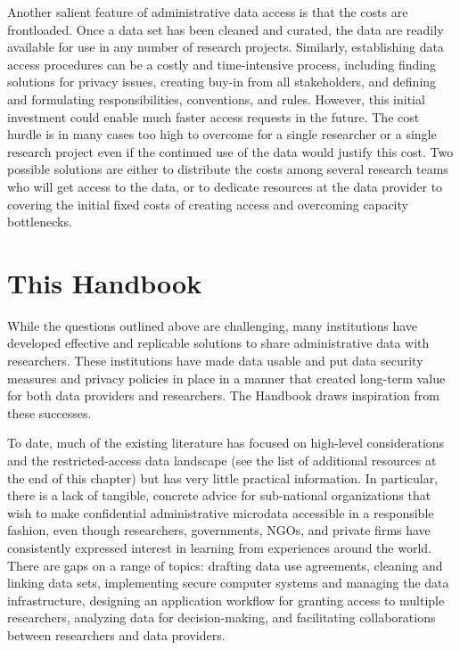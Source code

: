 Another salient feature of administrative data access is that the costs are frontloaded. Once a data set has been cleaned and curated, the data are readily available for use in any number of research projects. Similarly, establishing data access procedures can be a costly and time-intensive process, including finding solutions for privacy issues, creating buy-in from all stakeholders, and defining and formulating responsibilities, conventions, and rules. However, this initial investment could enable much faster access requests in the future. The cost hurdle is in many cases too high to overcome for a single researcher or a single research project even if the continued use of the data would justify this cost. Two possible solutions are either to distribute the costs among several research teams who will get access to the data, or to dedicate resources at the data provider to covering the initial fixed costs of creating access and overcoming capacity bottlenecks.

\hypertarget{this-handbook}{%
\section{This Handbook}\label{this-handbook}}

While the questions outlined above are challenging, many institutions have developed effective and replicable solutions to share administrative data with researchers. These institutions have made data usable and put data security measures and privacy policies in place in a manner that created long-term value for both data providers and researchers. The Handbook draws inspiration from these successes.

To date, much of the existing literature has focused on high-level considerations and the restricted-access data landscape (see the list of additional resources at the end of this chapter) but has very little practical information. In particular, there is a lack of tangible, concrete advice for sub-national organizations that wish to make confidential administrative microdata accessible in a responsible fashion, even though researchers, governments, NGOs, and private firms have consistently expressed interest in learning from experiences around the world. There are gaps on a range of topics: drafting data use agreements, cleaning and linking data sets, implementing secure computer systems and managing the data infrastructure, designing an application workflow for granting access to multiple researchers, analyzing data for decision-making, and facilitating collaborations between researchers and data providers.

